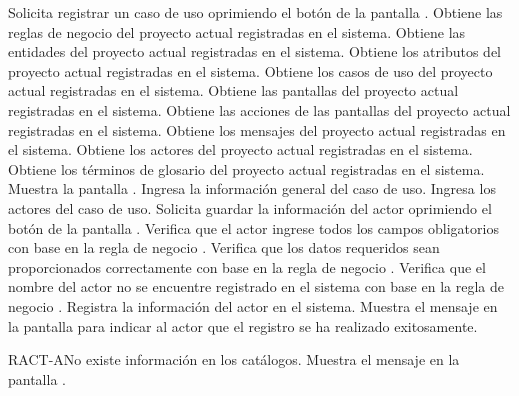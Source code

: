 	\begin{UCtrayectoria}
		\UCpaso[\UCactor] Solicita registrar un caso de uso oprimiendo el botón  de la pantalla .
		\UCpaso[\UCsist] Obtiene las reglas de negocio del proyecto actual registradas en el sistema.
		\UCpaso[\UCsist] Obtiene las entidades del proyecto actual registradas en el sistema.
		\UCpaso[\UCsist] Obtiene los atributos del proyecto actual registradas en el sistema.
		\UCpaso[\UCsist] Obtiene los casos de uso del proyecto actual registradas en el sistema.
		\UCpaso[\UCsist] Obtiene las pantallas del proyecto actual registradas en el sistema.
		\UCpaso[\UCsist] Obtiene las acciones de las pantallas del proyecto actual registradas en el sistema.
		\UCpaso[\UCsist] Obtiene los mensajes del proyecto actual registradas en el sistema.
		\UCpaso[\UCsist] Obtiene los actores del proyecto actual registradas en el sistema.
		\UCpaso[\UCsist] Obtiene los términos de glosario del proyecto actual registradas en el sistema.
		\UCpaso[\UCsist] Muestra la pantalla .
		\UCpaso[\UCactor] Ingresa la información general del caso de uso.
		\UCpaso[\UCactor] Ingresa los actores del caso de uso.
		\UCpaso[\UCactor] Solicita guardar la información del actor oprimiendo el botón  de la pantalla . \label{CU10.1-P5}  
		\UCpaso[\UCsist] Verifica que el actor ingrese todos los campos obligatorios con base en la regla de negocio . 
		\UCpaso[\UCsist] Verifica que los datos requeridos sean proporcionados correctamente con base en la regla de negocio .  
		\UCpaso[\UCsist] Verifica que el nombre del actor no se encuentre registrado en el sistema con base en la regla de negocio .  
		\UCpaso[\UCsist] Registra la información del actor en el sistema.
		\UCpaso[\UCsist] Muestra el mensaje  en la pantalla  para indicar al actor que el registro se ha realizado exitosamente.
	\end{UCtrayectoria}		
	
	\begin{UCtrayectoriaA}{RACT-A}{No existe información en los catálogos.}
		\UCpaso[\UCactor] Muestra el mensaje  en la pantalla .
	\end{UCtrayectoriaA}

